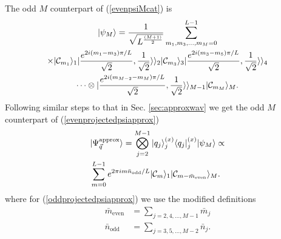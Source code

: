 \documentclass[%
  prx,%
  twocolumn,%
  preprintnumbers,%
  amsmath,%
  amssymb,%
  superscriptaddress%
]{revtex4}
\begin{document}
The odd $ M $ counterpart of (\ref{evenpsiMcat}) is
%
\begin{multline}
| \psi_M \rangle=\frac{1}{\sqrt{L^{\frac{(M+1)}{2}}}}\sum_{m_1,m_3,\ldots,m_M=0}^{L-1} \\
\times | {\cal C}_{m_1}  \rangle_1  |\frac{e^{2 i(m_{1}-m_{3})\pi/L }}{\sqrt{2}},\frac{1}{\sqrt{2}}\rangle\rangle_2 | {\cal C}_{m_3} \rangle_3
|\frac{e^{2 i(m_{3}-m_{5})\pi/L }}{\sqrt{2}},\frac{1}{\sqrt{2}}\rangle\rangle_4  \\
\dots \otimes |\frac{e^{2 i(m_{M-2}-m_{M})\pi/L }}{\sqrt{2}},\frac{1}{\sqrt{2}}\rangle\rangle_{M-1} | {\cal C}_{m_{M}}  \rangle_{M} .
\label{oddpsiMcat}
\end{multline}
%
Following similar steps to that in Sec. \ref{sec:approxwav} we get the odd $ M $ counterpart of (\ref{evenprojectedpsiapprox})
%
\begin{align}
& | \Psi_{\vec{q}}^{\text{approx}} \rangle =  \bigotimes_{j=2}^{M-1}  |q_j \rangle_j^{(x)} \langle q_j |_j^{(x)}  |\psi_M \rangle \propto \nonumber \\
& \sum_{m=0}^{L-1} e^{2 \pi i m \bar{n}_{\text{odd}}/L } | {\cal C}_{m}  \rangle_1 | {\cal C}_{m - \bar{m}_{\text{even}}}  \rangle_M  .  \label{oddprojectedpsiapprox}
\end{align}
%
where for (\ref{oddprojectedpsiapprox}) we use the modified definitions
%
\begin{align}
\bar{m}_\text{even} & =  
\sum_{j=2,4, \dots, M-1} \bar{m}_j  \nonumber \\
\bar{n}_{\text{odd}} & = \sum_{j=3,5,\dots, M-2} \bar{n}_j  . 
\end{align}


















% 

\end{document}

